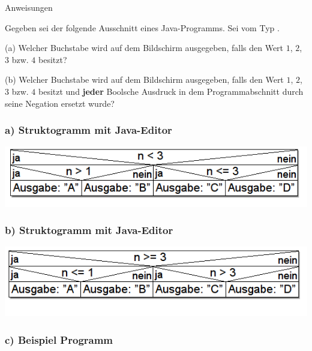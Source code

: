 \begin{frame}[t]%
\medskip

\begin{exercise}{Anweisungen}
\begin{body}
Gegeben sei der folgende Ausschnitt eines Java-Programms. Sei  vom Typ .
\medskip



\begin{parts}
\item[(a)] Welcher Buchstabe wird auf dem Bildschirm ausgegeben, falls  den Wert $1$, $2$, $3$ bzw. $4$ besitzt?
\item[(b)] Welcher Buchstabe wird auf dem Bildschirm ausgegeben, falls  den Wert $1$, $2$, $3$ bzw. $4$ besitzt und \textbf{jeder} Boolsche Ausdruck in dem Programmabschnitt durch seine Negation ersetzt wurde?
\end{parts}
\end{body}
\end{exercise}
\end{frame}


\begin{frame}[fragile]%
 \frametitle{a) Struktogramm mit Java-Editor}%

\begin{center}

\includegraphics[width=1\textwidth]{anweis-1/Bilder/Struktogramm_a}
\end{center}

\end{frame}


\begin{frame}[fragile]%
\frametitle{b) Struktogramm mit Java-Editor}%
\begin{center}

\includegraphics[width=1\textwidth]{anweis-1/Bilder/Struktogramm_b}
\end{center}

\end{frame}


\begin{frame}[fragile]%
 \frametitle{c) Beispiel Programm}%


\end{frame}
